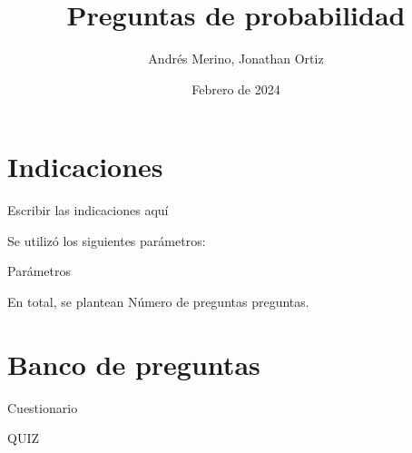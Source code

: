 \documentclass[a4,11pt]{article}
\title{Preguntas de probabilidad}
\author{Andrés Merino, Jonathan Ortiz}
\date{Febrero de 2024}
\begin{document}
\maketitle

\section{Indicaciones}

Escribir las indicaciones aquí



Se utilizó los siguientes parámetros:
\begin{itemize}
{{Parámetros}}
\end{itemize}
En total, se plantean {{Número de preguntas}} preguntas.


\section{Banco de preguntas}

\begin{quiz}{{{Cuestionario}}}

{{QUIZ}}


\end{quiz}
\end{document}
